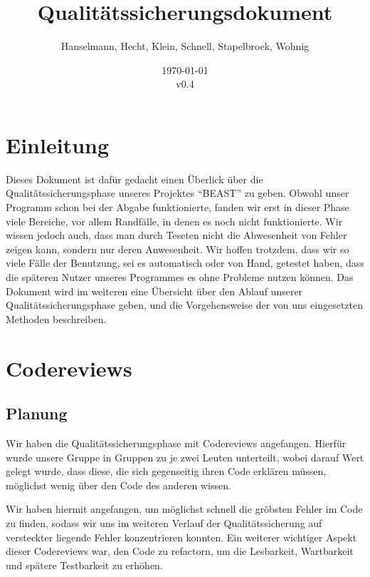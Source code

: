 \documentclass[a4paper]{scrreprt}
\begin{document}
\title{Qualitätssicherungsdokument}
\author{Hanselmann, Hecht, Klein, Schnell, Stapelbroek, Wohnig}
\date{\today\\v0.4}
\maketitle 
\tableofcontents	

\chapter{Einleitung}
Dieses Dokument ist dafür gedacht einen Überlick über die
Qualitätssicherungsphase unseres Projektes "`BEAST"' zu geben. Obwohl unser
Programm schon bei der Abgabe funktionierte, fanden wir erst in dieser Phase
viele Bereiche, vor allem Randfälle, in denen es noch nicht funktionierte. Wir
wissen jedoch auch, dass man durch Teseten nicht die Abwesenheit von Fehler
zeigen kann, sondern nur deren Anwesenheit. Wir hoffen trotzdem, dass wir so
viele Fälle der Benutzung, sei es automatisch oder von Hand, getestet haben,
dass die späteren Nutzer unseres Programmes es ohne Probleme nutzen können.
\newline
Das Dokument wird im weiteren eine Übersicht über den Ablauf unserer
Qualitätssicherungsphase geben, und die Vorgehensweise der von uns eingesetzten
Methoden beschreiben.

\chapter{Codereviews}

\section{Planung}
Wir haben die Qualitätssicherungsphase mit Codereviews angefangen.
Hierfür wurde unsere Gruppe in Gruppen zu je zwei Leuten unterteilt, wobei
darauf Wert gelegt wurde, dass diese, die sich gegenseitig ihren Code erklären
müssen, möglichst wenig über den Code des anderen wissen. 

Wir haben hiermit
angefangen, um möglichst schnell die gröbsten Fehler im Code zu finden, sodass
wir uns im weiteren Verlauf der Qualitätssicherung auf versteckter liegende Fehler konzentrieren
konnten. Ein weiterer wichtiger Aspekt dieser Codereviews war, den Code zu
refactorn, um die Lesbarkeit, Wartbarkeit und spätere Testbarkeit zu erhöhen.
\end{document}
